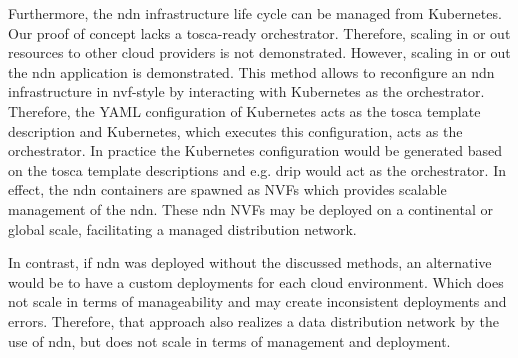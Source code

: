 Furthermore, the \gls{ndn} infrastructure life cycle can be managed from Kubernetes. Our proof of concept lacks a \gls{tosca}-ready orchestrator. Therefore, scaling in or out resources to other cloud providers is not demonstrated. However, scaling in or out the \gls{ndn} application is demonstrated. This method allows to reconfigure an \gls{ndn} infrastructure in \gls{nvf}-style by interacting with Kubernetes as the orchestrator. Therefore, the YAML configuration of Kubernetes acts as the \gls{tosca} template description and Kubernetes, which executes this configuration, acts as the orchestrator. In practice the Kubernetes configuration would be generated based on the \gls{tosca} template descriptions and e.g. \gls{drip} would act as the orchestrator. In effect, the \gls{ndn} containers are spawned as NVFs which provides scalable management of the \gls{ndn}. These \gls{ndn} NVFs may be deployed on a continental or global scale, facilitating a managed distribution network.

In contrast, if \gls{ndn} was deployed without the discussed methods, an alternative would be to have a custom deployments for each cloud environment. Which does not scale in terms of manageability and may create inconsistent deployments and errors. Therefore, that approach also realizes a data distribution network by the use of \gls{ndn}, but does not scale in terms of management and deployment.